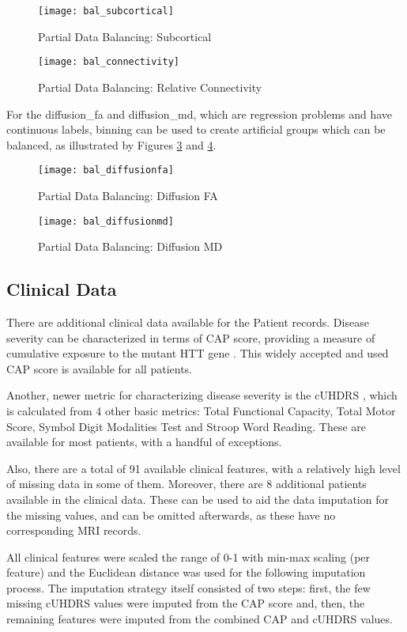 \begin{figure}[H]
\centering
\texttt{[image: bal\_subcortical]}
\caption{Partial Data Balancing: Subcortical}
\label{fig:bal_sub}
\end{figure}

\begin{figure}[H]
\centering
\texttt{[image: bal\_connectivity]}
\caption{Partial Data Balancing: Relative Connectivity}
\label{fig:bal_con}
\end{figure}

For the diffusion\_fa and diffusion\_md, which are regression problems and have continuous labels, binning can be used to create artificial groups which can be balanced, as illustrated by Figures \ref{fig:bal_fa} and \ref{fig:bal_md}.

\begin{figure}[H]
\centering
\texttt{[image: bal\_diffusionfa]}
\caption{Partial Data Balancing: Diffusion FA}
\label{fig:bal_fa}
\end{figure}

\begin{figure}[H]
\centering
\texttt{[image: bal\_diffusionmd]}
\caption{Partial Data Balancing: Diffusion MD}
\label{fig:bal_md}
\end{figure}

\subsection{Clinical Data}
\label{sec:clinical}

There are additional clinical data available for the Patient records. Disease severity can be characterized in terms of \ac{CAP} score, providing a measure of cumulative exposure to the mutant HTT gene \cite{cap}. This widely accepted and used \ac{CAP} score is available for all patients.\par
Another, newer metric for characterizing disease severity is the \ac{cUHDRS} \cite{uhdrs}, which is calculated from 4 other basic metrics: Total Functional Capacity, Total Motor Score, Symbol Digit Modalities Test and Stroop Word Reading. These are available for most patients, with a handful of exceptions.\par
Also, there are a total of 91 available clinical features, with a relatively high level of missing data in some of them. Moreover, there are 8 additional patients available in the clinical data. These can be used to aid the data imputation for the missing values, and can be omitted afterwards, as these have no corresponding \ac{MRI} records.\par
All clinical features were scaled the range of 0-1 with min-max scaling (per feature) and the Euclidean distance was used for the following imputation process. The imputation strategy itself consisted of two steps: first, the few missing \ac{cUHDRS} values were imputed from the \ac{CAP} score and, then, the remaining features were imputed from the combined \ac{CAP} and \ac{cUHDRS} values.

